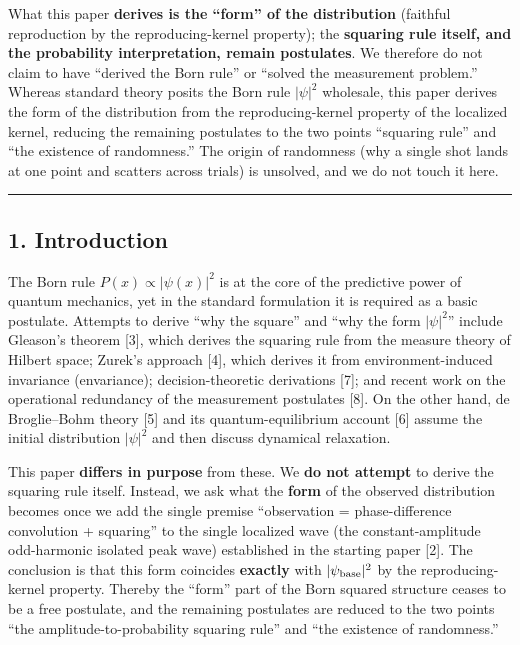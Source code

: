 \documentclass[
]{ltjsarticle}
\begin{document}
What this paper \textbf{derives is the ``form'' of the distribution}
(faithful reproduction by the reproducing-kernel property); the
\textbf{squaring rule itself, and the probability interpretation, remain
postulates}. We therefore do not claim to have ``derived the Born rule''
or ``solved the measurement problem.'' Whereas standard theory posits
the Born rule \(|\psi|^2\) wholesale, this paper derives the form of the
distribution from the reproducing-kernel property of the localized
kernel, reducing the remaining postulates to the two points ``squaring
rule'' and ``the existence of randomness.'' The origin of randomness
(why a single shot lands at one point and scatters across trials) is
unsolved, and we do not touch it here.

\begin{center}\rule{0.5\linewidth}{0.5pt}\end{center}

\subsection{1. Introduction}\label{introduction}

The Born rule \(P(x)\propto|\psi(x)|^2\) is at the core of the
predictive power of quantum mechanics, yet in the standard formulation
it is required as a basic postulate. Attempts to derive ``why the
square'' and ``why the form \(|\psi|^2\)'' include Gleason's theorem
{[}3{]}, which derives the squaring rule from the measure theory of
Hilbert space; Zurek's approach {[}4{]}, which derives it from
environment-induced invariance (envariance); decision-theoretic
derivations {[}7{]}; and recent work on the operational redundancy of
the measurement postulates {[}8{]}. On the other hand, de Broglie--Bohm
theory {[}5{]} and its quantum-equilibrium account {[}6{]} assume the
initial distribution \(|\psi|^2\) and then discuss dynamical relaxation.

This paper \textbf{differs in purpose} from these. We \textbf{do not
attempt} to derive the squaring rule itself. Instead, we ask what the
\textbf{form} of the observed distribution becomes once we add the
single premise ``observation = phase-difference convolution + squaring''
to the single localized wave (the constant-amplitude odd-harmonic
isolated peak wave) established in the starting paper {[}2{]}. The
conclusion is that this form coincides \textbf{exactly} with
\(|\psi_{\rm base}|^2\) by the reproducing-kernel property. Thereby the
``form'' part of the Born squared structure ceases to be a free
postulate, and the remaining postulates are reduced to the two points
``the amplitude-to-probability squaring rule'' and ``the existence of
randomness.''
\end{document}
